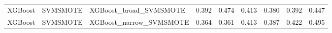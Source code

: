 \begin{tabular}{lllllllll}
                     XGBoost &            SVMSMOTE &                       XGBoost\_broad\_SVMSMOTE & 0.392 &                     0.474 &                 0.413 &                  0.380 &                                   0.392 &     0.447 \\
                     XGBoost &            SVMSMOTE &                      XGBoost\_narrow\_SVMSMOTE & 0.364 &                     0.361 &                 0.413 &                  0.387 &                                   0.422 &     0.495 \\
\bottomrule
\end{tabular}
